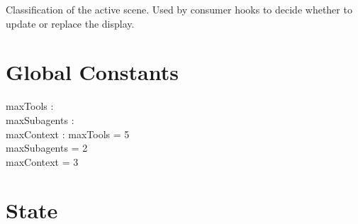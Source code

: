 \documentclass[a4paper,10pt,fleqn]{article}
\begin{document}
Classification of the active scene. Used by consumer hooks to decide
whether to update or replace the display.

\section{Global Constants}

\begin{axdef}
  maxTools : \nat \\
  maxSubagents : \nat \\
  maxContext : \nat
  \where
  maxTools = 5 \\
  maxSubagents = 2 \\
  maxContext = 3
\end{axdef}

\section{State}
\end{document}
